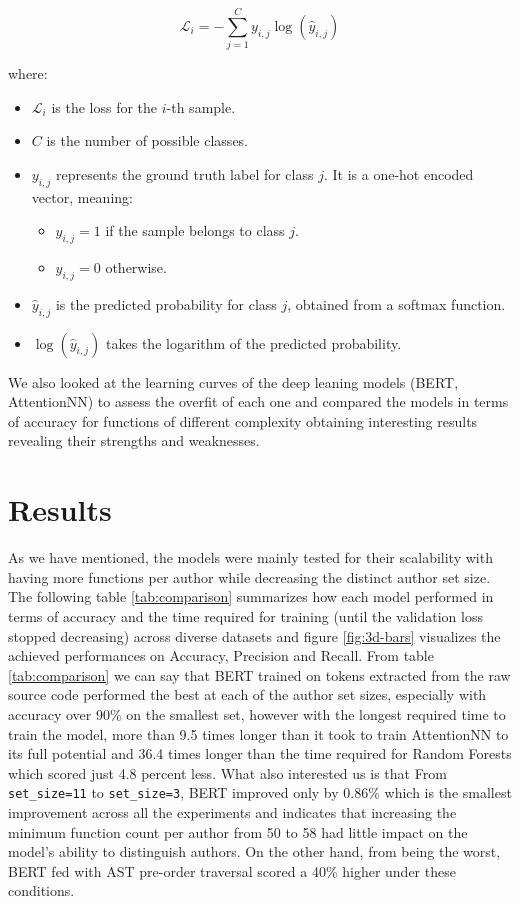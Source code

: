 \documentclass{article}
\begin{document}
\begin{equation}
    \mathcal{L}_i = - \sum_{j=1}^{C} y_{i,j} \log(\hat{y}_{i,j})
\end{equation}

where:
\begin{itemize}
    \item $\mathcal{L}_i$ is the loss for the $i$-th sample.
    \item $C$ is the number of possible classes.
    \item $y_{i,j}$ represents the ground truth label for class $j$. It is a one-hot encoded vector, meaning:
    \begin{itemize}
        \item $y_{i,j} = 1$ if the sample belongs to class $j$.
        \item $y_{i,j} = 0$ otherwise.
    \end{itemize}
    \item $\hat{y}_{i,j}$ is the predicted probability for class $j$, obtained from a softmax function.
    \item $\log(\hat{y}_{i,j})$ takes the logarithm of the predicted probability.
\end{itemize}

We also looked at the learning curves of the deep leaning models (BERT, AttentionNN) to assess the overfit of each one and compared the models in terms of 
accuracy for functions of different complexity obtaining interesting results revealing their strengths and weaknesses.


\section{Results}

As we have mentioned, the models were mainly tested for their scalability with having more functions per author while decreasing the distinct author set size.
The following table \ref{tab:comparison} summarizes how each model performed in terms of accuracy and the time required for training (until the validation loss stopped decreasing) across diverse datasets
and figure \ref{fig:3d-bars} visualizes the achieved performances on Accuracy, Precision and Recall. From table \ref{tab:comparison} we can say that BERT 
trained on tokens extracted from the raw source code performed the best at each of the author set sizes, especially with accuracy over 90\% on the smallest set, however with the longest required time to train the model, more than 
9.5 times longer than it took to train AttentionNN to its full potential and 36.4 times longer than the time required for Random Forests which scored just 4.8 percent less.
What also interested us is that From \texttt{set\_size=11} to \texttt{set\_size=3}, BERT improved only by 0.86\% which is the smallest improvement across all the experiments and indicates that increasing the minimum function 
count per author from 50 to 58 had little impact on the model's ability to distinguish authors. 
On the other hand, from being the worst, BERT fed with AST pre-order traversal scored a 40\% higher under these conditions. 
\end{document}
